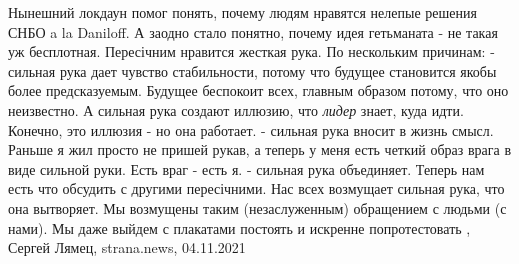 Нынешний локдаун помог понять, почему людям нравятся нелепые решения СНБО a la
Daniloff. А заодно стало понятно, почему идея гетьманата - не такая уж
бесплотная.  Пересічним нравится жесткая рука. По нескольким причинам:
- сильная рука дает чувство стабильности, потому что будущее становится якобы
более предсказуемым. Будущее беспокоит всех, главным образом потому, что оно
неизвестно. А сильная рука создают иллюзию, что \emph{лидер} знает, куда идти.
Конечно, это иллюзия - но она работает.  - сильная рука вносит в жизнь смысл.
Раньше я жил просто не пришей рукав, а теперь у меня есть четкий образ врага в
виде сильной руки. Есть враг - есть я.  - сильная рука объединяет. Теперь нам
есть что обсудить с другими пересічними. Нас всех возмущает сильная рука, что
она вытворяет. Мы возмущены таким (незаслуженным) обращением с людьми (с нами).
Мы даже выйдем с плакатами постоять и искренне попротестовать
, 
Сергей Лямец, strana.news, 04.11.2021
